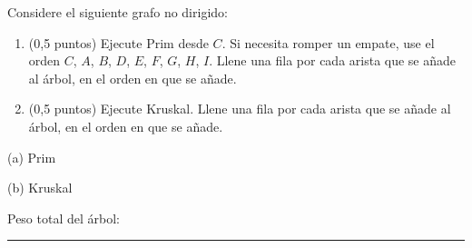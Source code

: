 
Considere el siguiente grafo no dirigido:

\begin{center}
  \begin{tikzpicture}
    
  \end{tikzpicture}
\end{center}

\begin{enumerate}[label=(\alph*)]
  \item (0,5 puntos) Ejecute Prim desde $C$. Si necesita romper un empate, use el orden $C$, $A$, $B$, $D$, $E$, $F$, $G$, $H$, $I$. Llene una fila por cada arista que se añade al árbol, en el orden en que se añade.
  \item (0,5 puntos) Ejecute Kruskal. Llene una fila por cada arista que se añade al árbol, en el orden en que se añade.
\end{enumerate}

\begin{minipage}[t]{0.48\textwidth}
  \centering (a) Prim
\end{minipage}%
\hfill
\begin{minipage}[t]{0.48\textwidth}
  \centering (b) Kruskal
\end{minipage}

\bigskip
Peso total del árbol: \rule{3cm}{0.4pt}
